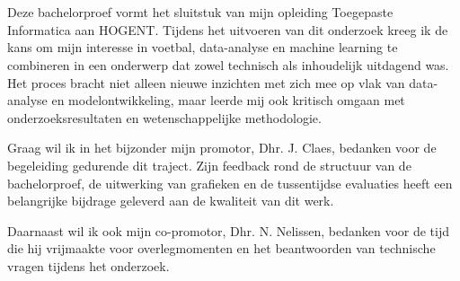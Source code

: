 
\chapter*{}%
\label{ch:voorwoord}

Deze bachelorproef vormt het sluitstuk van mijn opleiding Toegepaste Informatica aan HOGENT. 
Tijdens het uitvoeren van dit onderzoek kreeg ik de kans om mijn interesse in voetbal, 
data-analyse en machine learning te combineren in een onderwerp dat zowel technisch als inhoudelijk uitdagend was. 
Het proces bracht niet alleen nieuwe inzichten met zich mee op vlak van data-analyse en modelontwikkeling, 
maar leerde mij ook kritisch omgaan met onderzoeksresultaten en wetenschappelijke methodologie.

\vspace{5pt}

Graag wil ik in het bijzonder mijn promotor, Dhr. J. Claes, bedanken voor de begeleiding gedurende dit traject. 
Zijn feedback rond de structuur van de bachelorproef, de uitwerking van grafieken en 
de tussentijdse evaluaties heeft een belangrijke bijdrage geleverd aan de kwaliteit van dit werk.

\vspace{5pt}

Daarnaast wil ik ook mijn co-promotor, Dhr. N. Nelissen, bedanken voor de tijd die hij vrijmaakte voor overlegmomenten en 
het beantwoorden van technische vragen tijdens het onderzoek.